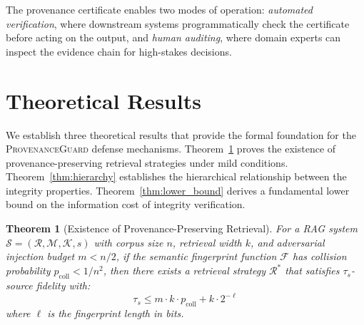 \documentclass[journal,10pt]{IEEEtran}
\newtheorem{theorem}{Theorem}
\newcommand{\calR}{\mathcal{R}}
\newcommand{\calM}{\mathcal{M}}
\newcommand{\calS}{\mathcal{S}}
\newcommand{\calF}{\mathcal{F}}
\newcommand{\calK}{\mathcal{K}}
\begin{document}
The provenance certificate enables two modes of operation: \emph{automated verification}, where downstream systems programmatically check the certificate before acting on the output, and \emph{human auditing}, where domain experts can inspect the evidence chain for high-stakes decisions.

\section{Theoretical Results}\label{sec:theory}

We establish three theoretical results that provide the formal foundation for the \textsc{ProvenanceGuard} defense mechanisms. Theorem~\ref{thm:existence} proves the existence of provenance-preserving retrieval strategies under mild conditions. Theorem~\ref{thm:hierarchy} establishes the hierarchical relationship between the integrity properties. Theorem~\ref{thm:lower_bound} derives a fundamental lower bound on the information cost of integrity verification.

\begin{theorem}[Existence of Provenance-Preserving Retrieval]\label{thm:existence}
For a RAG system $\calS = (\calR, \calM, \calK, s)$ with corpus size $n$, retrieval width $k$, and adversarial injection budget $m < n/2$, if the semantic fingerprint function $\calF$ has collision probability $p_{\mathrm{coll}} < 1/n^2$, then there exists a retrieval strategy $\calR^*$ that satisfies $\tau_s$-source fidelity with:
\begin{equation}\label{eq:existence}
\tau_s \leq m \cdot k \cdot p_{\mathrm{coll}} + k \cdot 2^{-\ell}
\end{equation}
where $\ell$ is the fingerprint length in bits.
\end{theorem}
\end{document}
